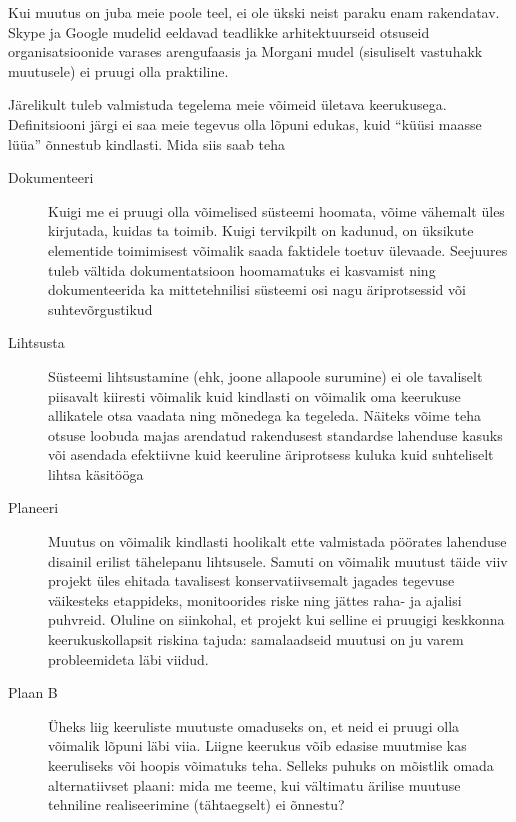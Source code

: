 \documentclass{tufte-book}
\begin{document}
Kui muutus on juba meie poole teel, ei ole ükski neist paraku enam rakendatav. Skype ja Google mudelid eeldavad teadlikke arhitektuurseid otsuseid organisatsioonide varases arengufaasis ja Morgani mudel (sisuliselt vastuhakk muutusele) ei pruugi olla praktiline. 

Järelikult tuleb valmistuda tegelema meie võimeid ületava keerukusega. Definitsiooni järgi ei saa meie tegevus olla lõpuni edukas, kuid \enquote{küüsi maasse lüüa} õnnestub kindlasti. Mida siis saab teha 
\begin{description}
	\item[Dokumenteeri] Kuigi me ei pruugi olla võimelised süsteemi hoomata, võime vähemalt üles kirjutada, kuidas ta toimib. Kuigi tervikpilt on kadunud, on üksikute elementide toimimisest võimalik saada faktidele toetuv ülevaade. Seejuures tuleb vältida dokumentatsioon hoomamatuks ei kasvamist ning dokumenteerida ka mittetehnilisi süsteemi osi nagu äriprotsessid või suhtevõrgustikud
	\item[Lihtsusta] Süsteemi lihtsustamine (ehk, joone allapoole surumine) ei ole tavaliselt piisavalt kiiresti võimalik kuid kindlasti on võimalik oma keerukuse allikatele otsa vaadata ning mõnedega ka tegeleda. Näiteks võime teha otsuse loobuda majas arendatud rakendusest standardse lahenduse kasuks või asendada efektiivne kuid keeruline äriprotsess kuluka kuid suhteliselt lihtsa käsitööga
	\item[Planeeri] Muutus on võimalik kindlasti hoolikalt ette valmistada pöörates lahenduse disainil erilist tähelepanu lihtsusele. Samuti on võimalik muutust täide viiv projekt üles ehitada tavalisest konservatiivsemalt jagades tegevuse väikesteks etappideks, monitoorides riske ning jättes raha- ja ajalisi puhvreid. Oluline on siinkohal, et projekt kui selline ei pruugigi keskkonna keerukuskollapsit riskina tajuda: samalaadseid muutusi on ju varem probleemideta läbi viidud. 
	\item[Plaan B] Üheks liig keeruliste muutuste omaduseks on, et neid ei pruugi olla võimalik lõpuni läbi viia. Liigne keerukus võib edasise muutmise kas keeruliseks või hoopis võimatuks teha. Selleks puhuks on mõistlik omada alternatiivset plaani: mida me teeme, kui vältimatu ärilise muutuse tehniline realiseerimine (tähtaegselt) ei õnnestu?
\end{description}
\end{document}
